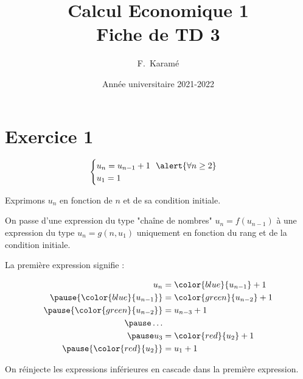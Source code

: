 \documentclass[9pt,handout,hyperref]{beamer}
\title{Calcul Economique 1\\Fiche de TD 3}
\author{F.~Karamé}
\date{Année universitaire 2021-2022}
\begin{document}
\begin{frame}
  \titlepage
\end{frame}

\section{Exercice 1}


\begin{frame}

    \[
      \begin{cases}
        u_n = u_{n-1} + 1~~\alert{\forall n \ge 2}\\
        u_1 = 1
      \end{cases}
    \]

    \pause Exprimons $u_n$ en fonction de $n$ et de sa condition initiale.\newline

    \pause On passe d'une expression du type "chaîne de nombres" $u_n = f(u_{n-1})$ \pause à une expression du type $u_n = g(n,u_1)$ uniquement en fonction du rang et de la condition initiale.\newline

    \pause La première expression signifie :

    \[\begin{aligned}
        u_n &= {\color{blue}{{u_{n-1}}}} + 1\\
        \pause {\color{blue}{u_{n-1}}} &= {\color{green}{u_{n-2}}} + 1\\
        \pause {\color{green}{u_{n-2}}} &= u_{n-3} + 1\\
        \pause \dots\\
        \pause u_{3} &= {\color{red}{u_{2}}} + 1\\
        \pause {\color{red}{u_{2}}} &= u_{1} + 1
      \end{aligned}\]

    \pause On réinjecte les expressions inférieures en cascade dans la première expression.

  \end{frame}
\end{document}
